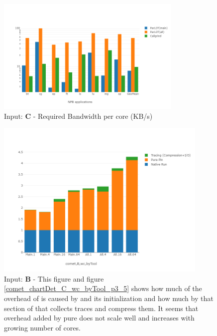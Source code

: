 \begin{figure}[!t]
\centering
\includegraphics[width=3.5in]{figs.comet/comet_chartAvg_bw_C_p3_5.png}
\caption{ Input: \textbf{C}  - Required Bandwidth per core (KB/s)
}
\label{comet_chartAvg_bw_C_p3_5}
\end{figure}
































\begin{figure}[!t]
\centering
\includegraphics[width=4in]{figs.comet/comet_chartDet_B_wc_byTool_p3_5.png}
\caption{ Input: \textbf{B} - This figure and figure \ref{comet_chartDet_C_wc_byTool_p3_5} shows how much of the overhead of \parlot is caused by \pin and its initialization and how much by that section of \parlot that collects traces and compress them. It seems that overhead added by pure \pin does not scale well and increases with growing number of cores.
}
\label{comet_chartDet_B_wc_byTool_p3_5}
\end{figure}


